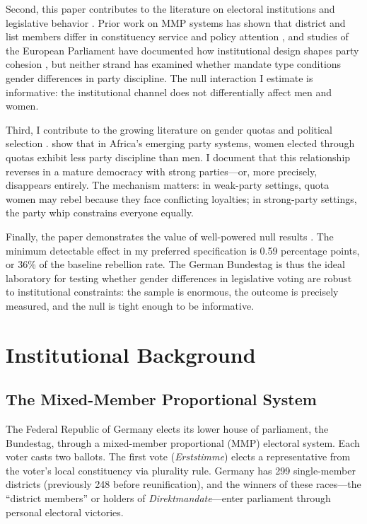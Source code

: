 \documentclass[12pt]{article}
\begin{document}
Second, this paper contributes to the literature on electoral institutions and legislative behavior \citep{carey2006, haspel1998, kunicova2004, hix2005}. Prior work on MMP systems has shown that district and list members differ in constituency service and policy attention \citep{stratmann2006, sieberer2020}, and studies of the European Parliament have documented how institutional design shapes party cohesion \citep{hix2005}, but neither strand has examined whether mandate type conditions gender differences in party discipline. The null interaction I estimate is informative: the institutional channel does not differentially affect men and women.

Third, I contribute to the growing literature on gender quotas and political selection \citep{besley2017, baltrunaite2014, depaola2011}. \citet{clayton2021} show that in Africa's emerging party systems, women elected through quotas exhibit less party discipline than men. I document that this relationship reverses in a mature democracy with strong parties---or, more precisely, disappears entirely. The mechanism matters: in weak-party settings, quota women may rebel because they face conflicting loyalties; in strong-party settings, the party whip constrains everyone equally.

Finally, the paper demonstrates the value of well-powered null results \citep{caughey2017}. The minimum detectable effect in my preferred specification is 0.59 percentage points, or 36\% of the baseline rebellion rate. The German Bundestag is thus the ideal laboratory for testing whether gender differences in legislative voting are robust to institutional constraints: the sample is enormous, the outcome is precisely measured, and the null is tight enough to be informative.

\section{Institutional Background}\label{sec:background}

\subsection{The Mixed-Member Proportional System}

The Federal Republic of Germany elects its lower house of parliament, the Bundestag, through a mixed-member proportional (MMP) electoral system. Each voter casts two ballots. The first vote (\textit{Erststimme}) elects a representative from the voter's local constituency via plurality rule. Germany has 299 single-member districts (previously 248 before reunification), and the winners of these races---the ``district members'' or holders of \textit{Direktmandate}---enter parliament through personal electoral victories.
\end{document}

